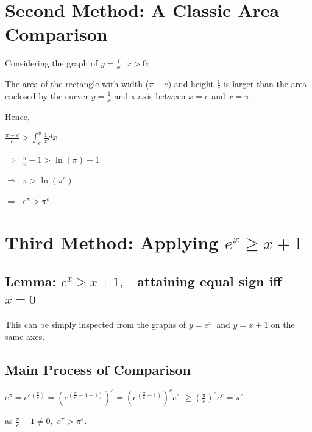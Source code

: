 \documentclass{article}
\begin{document}
\section{Second Method: A Classic Area Comparison }
Considering the graph of $y = \frac{1}{x},\ x>0$:

\begin{figure}[h]
\centering
{}
\end{figure}

The area of the rectangle with width ($\pi-e$) and height $\frac{1}{e}$
is larger than the area enclosed by the curver $y=\frac{1}{x}$ and x-axis between $x=e$ and $x=\pi$.

Hence,

\begin{center}
$\frac{\pi-e}{e} > \int^{\pi}_{e} \frac{1}{x} dx$

\vspace{0.2cm}
$\Rightarrow$\ $\frac{\pi}{e}-1 > \ln(\pi)-1$

\vspace{0.2cm}
$\Rightarrow$\ $\pi > \ln(\pi^e)$

\vspace{0.2cm}
$\Rightarrow$\ $e^\pi > \pi^e$.

\end{center}


\section{Third Method: Applying $e^x \ge x+1$}
\subsection{Lemma: $e^x \ge x+1,$ \ attaining equal sign iff $x=0$}
This can be simply inspected from the graphs of $y=e^x$\ and $y=x+1$ on the same axes.

\subsection{Main Process of Comparison}
\begin{center}
$e^\pi = e^{e(\frac{\pi}{e})} = (e^{(\frac{\pi}{e}-1+1)})^e = (e^{(\frac{\pi}{e}-1)})^e e^e$
$\ge (\frac{\pi}{e})^e e^e = \pi^e$

\vspace{0.5cm}
as ${\frac{\pi}{e}-1} \neq 0$,\ $e^\pi > \pi^e$.
\end{center}
\end{document}
